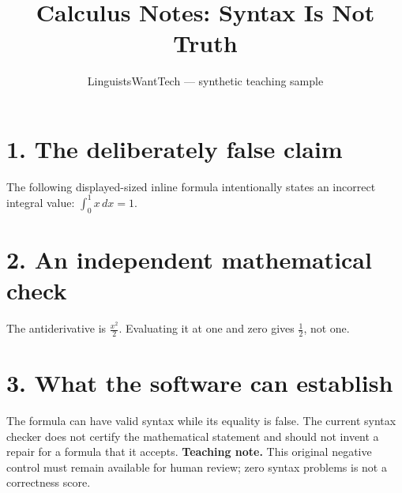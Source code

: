 \documentclass[12pt]{article}
\title{Calculus Notes: Syntax Is Not Truth}
\author{LinguistsWantTech --- synthetic teaching sample}
\date{}
\begin{document}
\maketitle
\section*{1. The deliberately false claim}
The following displayed-sized inline formula intentionally states
an incorrect integral value:
$\displaystyle \int_0^1 x\,dx=1$.
\section*{2. An independent mathematical check}
The antiderivative is $\frac{x^2}{2}$. Evaluating it at one and zero
gives $\frac{1}{2}$, not one.
\section*{3. What the software can establish}
The formula can have valid syntax while its equality is false.
The current syntax checker does not certify the mathematical statement
and should not invent a repair for a formula that it accepts.
\textbf{Teaching note.} This original negative control must remain
available for human review; zero syntax problems is not a correctness score.
\end{document}
